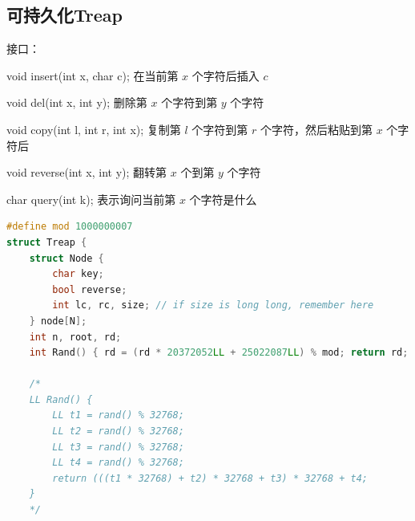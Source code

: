 \documentclass{article}
\begin{document}
\subsection{可持久化Treap}
接口： 

void insert(int x, char c); 在当前第 $x$ 个字符后插入 $c$ 

void del(int x, int y); 删除第 $x$ 个字符到第 $y$ 个字符 

void copy(int l, int r, int x); 复制第 $l$ 个字符到第 $r$ 个字符，然后粘贴到第 $x$ 个字符后 

void reverse(int x, int y); 翻转第 $x$ 个到第 $y$ 个字符 

char query(int k); 表示询问当前第 $x$ 个字符是什么
\begin{lstlisting}[language=C++]
#define mod 1000000007
struct Treap {
	struct Node {
		char key;
		bool reverse;
		int lc, rc, size; // if size is long long, remember here
	} node[N];
	int n, root, rd;
	int Rand() { rd = (rd * 20372052LL + 25022087LL) % mod; return rd; }
	
	/*
	LL Rand() {
        LL t1 = rand() % 32768;
        LL t2 = rand() % 32768;
        LL t3 = rand() % 32768;
        LL t4 = rand() % 32768;
        return (((t1 * 32768) + t2) * 32768 + t3) * 32768 + t4;
    }
    */	
	

\end{lstlisting}
\end{document}
